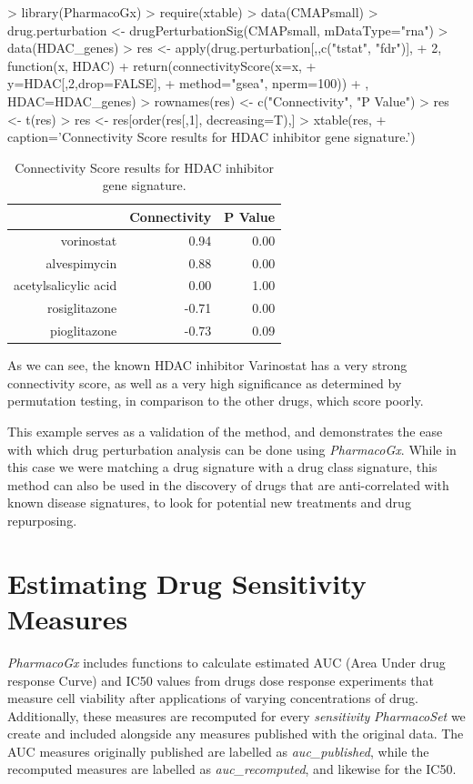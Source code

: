 \documentclass[11pt]{article}
\begin{document}
\begin{Schunk}
\begin{Sinput}
>   library(PharmacoGx)
>   require(xtable)
>   data(CMAPsmall)
>   drug.perturbation <- drugPerturbationSig(CMAPsmall, mDataType="rna")
>   data(HDAC_genes)
>   res <- apply(drug.perturbation[,,c("tstat", "fdr")],
+                2, function(x, HDAC){ 
+ 	    return(connectivityScore(x=x, 
+ 	                             y=HDAC[,2,drop=FALSE], 
+ 	                             method="gsea", nperm=100))
+ 	}, HDAC=HDAC_genes)
>   rownames(res) <- c("Connectivity", "P Value")
>   res <- t(res)
>   res <- res[order(res[,1], decreasing=T),]
>   xtable(res, 
+     caption='Connectivity Score results for HDAC inhibitor gene signature.')
\end{Sinput}
\begin{table}[ht]
\centering
\begin{tabular}{rrr}
  \hline
 & Connectivity & P Value \\ 
  \hline
vorinostat & 0.94 & 0.00 \\ 
  alvespimycin & 0.88 & 0.00 \\ 
  acetylsalicylic acid & 0.00 & 1.00 \\ 
  rosiglitazone & -0.71 & 0.00 \\ 
  pioglitazone & -0.73 & 0.09 \\ 
   \hline
\end{tabular}
\caption{Connectivity Score results for HDAC inhibitor gene signature.} 
\end{table}\end{Schunk}
As we can see, the known HDAC inhibitor Varinostat has a very strong connectivity score, as well as a very high significance as determined by permutation testing, in comparison to the other drugs, which score poorly. 

This example serves as a validation of the method, and demonstrates the ease with which drug perturbation analysis can be done using \textit{PharmacoGx}. While in this case we were matching a drug signature with a drug class signature, this method can also be used in the discovery of drugs that are anti-correlated with known disease signatures, to look for potential new treatments and drug repurposing.


\section{Estimating Drug Sensitivity Measures}
\textit{PharmacoGx} includes functions to calculate estimated AUC (Area Under
drug response Curve) and IC50 values from drugs dose response experiments that
measure cell viability after applications of varying concentrations of drug.
Additionally, these measures are recomputed for every \textit{sensitivity}
\textit{PharmacoSet} we create and included alongside any measures published
with the original data. The AUC measures originally published are labelled as \textit{auc\_published}, while the recomputed measures are labelled as \textit{auc\_recomputed}, and likewise for the IC50.
\end{document}
